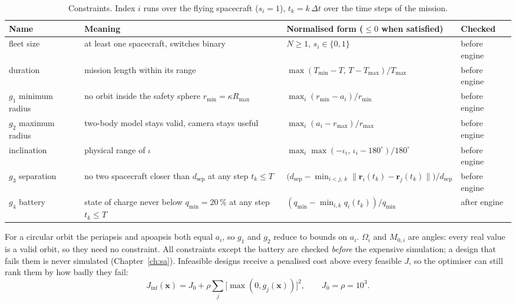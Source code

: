 \begin{table}[htbp]
\centering
\caption{Constraints. Index $i$ runs over the flying spacecraft ($s_i=1$), $t_k=k\,\Delta t$ over
the time steps of the mission.}
\label{tab:constraints}
\footnotesize
\begin{tabularx}{\textwidth}{@{}p{2.2cm}Xp{4.6cm}p{1.6cm}@{}}
\toprule
Name & Meaning & Normalised form ($\le0$ when satisfied) & Checked \\
\midrule
fleet size & at least one spacecraft, switches binary & $N\ge1$, $s_i\in\{0,1\}$ & before engine \\
duration & mission length within its range & $\max(T_{\min}-T,\,T-T_{\max})/T_{\max}$ & before engine \\
$g_1$ minimum radius & no orbit inside the safety sphere $r_{\min}=\kappa R_{\max}$ & $\max_i (r_{\min}-a_i)/r_{\min}$ & before engine \\
$g_2$ maximum radius & two-body model stays valid, camera stays useful & $\max_i (a_i-r_{\max})/r_{\max}$ & before engine \\
inclination & physical range of $\iota$ & $\max_i\max(-\iota_i,\,\iota_i-180^\circ)/180^\circ$ & before engine \\
$g_3$ separation & no two spacecraft closer than $d_{\mathrm{sep}}$ at any step $t_k\le T$ & $\bigl(d_{\mathrm{sep}}-\min_{i<j,\,k}\|\mathbf{r}_i(t_k)-\mathbf{r}_j(t_k)\|\bigr)/d_{\mathrm{sep}}$ & before engine \\
$g_4$ battery & state of charge never below $q_{\min}=20\,\%$ at any step $t_k\le T$ & $(q_{\min}-\min_{i,k}q_i(t_k))/q_{\min}$ & after engine \\
\bottomrule
\end{tabularx}
\end{table}

For a circular orbit the periapsis and apoapsis both equal $a_i$, so $g_1$ and $g_2$ reduce to
bounds on $a_i$. $\Omega_i$ and $M_{0,i}$ are angles: every real value is a valid orbit, so they
need no constraint. All constraints except the battery are checked \emph{before} the expensive
simulation; a design that fails them is never simulated (Chapter~\ref{ch:sa}). Infeasible designs
receive a penalised cost above every feasible $J$, so the optimiser can still rank them by how
badly they fail:
\begin{equation}
J_{\mathrm{inf}}(\mathbf{x})=J_0+\rho\sum_j\bigl[\max(0,g_j(\mathbf{x}))\bigr]^2,\qquad J_0=\rho=10^3 .
\label{eq:penalty}
\end{equation}

